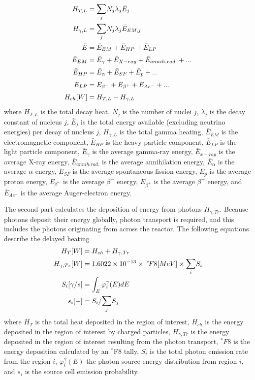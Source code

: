 \begin{align}
H_{T, L} &= \mathlarger{\sum}_j N_j \lambda_j \bar{E}_j \\
H_{\gamma, L} &= \mathlarger{\sum}_j N_j \lambda_j \bar{E}_{EM, j} \\
\bar{E} &= \bar{E}_{EM} + \bar{E}_{HP} + \bar{E}_{LP} \\
\bar{E}_{EM} &= \bar{E}_{\gamma} + \bar{E}_{X-ray} + \bar{E}_{annih.rad.} + ... \\
\bar{E}_{HP} &= \bar{E}_{\alpha} + \bar{E}_{SF} + \bar{E}_{p} + ... \\
\bar{E}_{LP} &= \bar{E}_{\beta^-} + \bar{E}_{\beta^+} + \bar{E}_{Ae^-} + ... \\
H_{ch} [W] &= H_{T, L} - H_{\gamma, L}
\end{align}
where $H_{T, L}$ is the total decay heat, $N_j$ is the number of nuclei $j$, $\lambda_j$ is the decay constant of nucleus $j$, $\bar{E}_j$ is the total energy available (excluding neutrino energies) per decay of nucleus $j$, $H_{\gamma, L}$ is the total gamma heating, $\bar{E}_{EM}$ is the electromagnetic component, $\bar{E}_{HP}$ is the heavy particle component, $\bar{E}_{LP}$ is the light particle component, $\bar{E}_{\gamma}$ is the average gamma-ray energy, $\bar{E}_{x-ray}$ is the average X-ray energy, $\bar{E}_{annih.rad.}$ is the average annihilation energy, $\bar{E}_{\alpha}$ is the average $\alpha$ energy, $\bar{E}_{SF}$ is the average spontaneous fission energy, $\bar{E}_{p}$ is the average proton energy, $\bar{E}_{\beta^-}$ is the average $\beta^-$ energy, $\bar{E}_{\beta^+}$ is the average $\beta^+$ energy, and $\bar{E}_{Ae^-}$ is the average Auger-electron energy.

The second part calculates the deposition of energy from photons $H_{\gamma, Tr}$.
Because photons deposit their energy globally, photon transport is required, and this includes the photons originating from across the reactor.
The following equations describe the delayed heating
\begin{align}
H_{T} [W] &= H_{ch} + H_{\gamma, Tr}  \label{eq-heat} \\
H_{\gamma, Tr} [W] &= 1.6022 \times 10^{-13} \times \: ^* \! F8 [MeV] \times \mathlarger{\sum}_i S_i \label{eq-ga-tr} \\
S_i[\gamma/s] &= \int_{E} \varphi^\gamma_i(E) dE \\
s_i [-] &= S_i / \mathlarger{\sum}_j S_j \label{eq-emiprob}
\end{align}
where $H_{T}$ is the total heat deposited in the region of interest, $H_{ch}$ is the energy deposited in the region of interest by charged particles, $H_{\gamma, Tr}$ is the energy deposited in the region of interest resulting from the photon transport, $^\ast F8$ is the energy deposition calculated by an $^\ast$F8 tally, $S_i$ is the total photon emission rate from the region $i$, $\varphi^\gamma_i(E)$ the photon source energy distribution from region $i$, and $s_i$ is the source cell emission probability.

